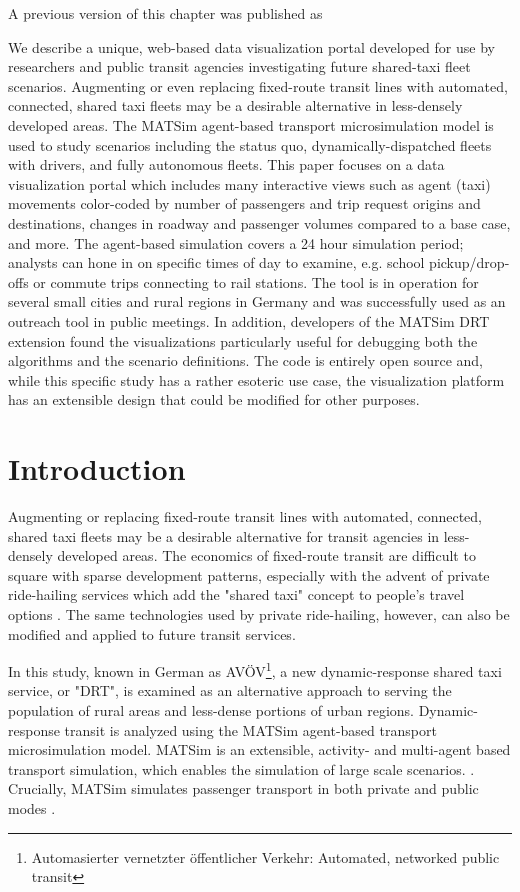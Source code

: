 A previous version of this chapter was published as %

We describe a unique, web-based data visualization portal developed for use by researchers and public transit agencies investigating future shared-taxi fleet scenarios. Augmenting or even replacing fixed-route transit lines with automated, connected, shared taxi fleets may be a desirable alternative in less-densely developed areas. The MATSim agent-based transport microsimulation model is used to study scenarios including the status quo, dynamically-dispatched fleets with drivers, and fully autonomous fleets. This paper focuses on a data visualization portal which includes many interactive views such as agent (taxi) movements color-coded by number of passengers and trip request origins and destinations, changes in roadway and passenger volumes compared to a base case, and more. The agent-based simulation covers a 24 hour simulation period; analysts can hone in on specific times of day to examine, e.g. school pickup/drop-offs or commute trips connecting to rail stations. The tool is in operation for several small cities and rural regions in Germany and was successfully used as an outreach tool in public meetings. In addition, developers of the MATSim DRT extension found the visualizations particularly useful for debugging both the algorithms and the scenario definitions. The code is entirely open source and, while this specific study has a rather esoteric use case, the visualization platform has an extensible design that could be modified for other purposes.

\section{Introduction}
\label{pave-introduction}

Augmenting or replacing fixed-route transit lines with automated, connected, shared taxi fleets may be a desirable alternative for transit agencies in less-densely developed areas. The economics of fixed-route transit are difficult to square with sparse development patterns, especially with the advent of private ride-hailing services which add the "shared taxi" concept to people's travel options \cite{Hough2018}. The same technologies used by private ride-hailing, however, can also be modified and applied to future transit services.

In this study, known in German as AVÖV\footnote{Automasierter vernetzter öffentlicher Verkehr: Automated, networked public transit}, a new dynamic-response shared taxi service, or "DRT", is examined as an alternative approach to serving the population of rural areas and less-dense portions of urban regions. Dynamic-response transit is analyzed using the MATSim agent-based transport microsimulation model. MATSim is an extensible, activity- and multi-agent based transport simulation, which enables the simulation of large scale scenarios. \cite{MATSimBook}. Crucially, MATSim simulates passenger transport in both private and public modes \cite{ZiemkeEtAl2019OpenBerlinScenario}.

